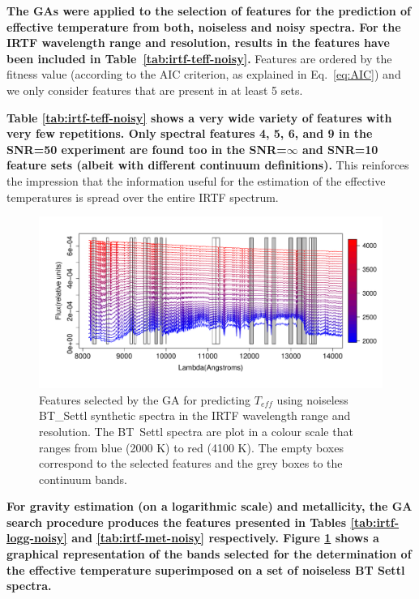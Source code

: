 \textbf{
The GAs were applied to the selection of features for the prediction
of effective temperature from both, noiseless and noisy spectra.  For
the IRTF wavelength range and resolution, results in the features have
been included in Table~\ref{tab:irtf-teff-noisy}.} Features are
ordered by the fitness value (according to the AIC criterion, as
explained in Eq.~\ref{eq:AIC}) and we only consider features that are
present in at least 5 sets.

{\bf Table
\ref{tab:irtf-teff-noisy}
shows a very wide variety of features with very few repetitions. Only
spectral features 4, 5, 6, and 9 in the SNR=50 experiment are found
too in the SNR=$\infty$ and SNR=10 feature sets (albeit with different
continuum definitions).} This reinforces the impression that the
information useful for the estimation of the effective temperatures is
spread over the entire IRTF spectrum.

\begin{figure}
\includegraphics[width=\textwidth]{figs/BT-spectraAtIRTF-Inf-teff2}
 \caption{Features selected by the GA for predicting $T_{eff}$ using
    noiseless BT\_Settl synthetic spectra in the IRTF wavelength range
    and resolution. The BT\ Settl spectra are plot in a colour scale
    that ranges from blue (2000 K) to red (4100 K). The empty boxes
    correspond to the selected features and the grey boxes to the
    continuum bands.}  \label{fig:IRTF-teff}
\end{figure}

{\bf For gravity estimation (on a logarithmic scale) and metallicity,
the GA search procedure produces the features presented in Tables
\ref{tab:irtf-logg-noisy} and \ref{tab:irtf-met-noisy}
respectively. Figure \ref{fig:IRTF-teff} shows a graphical
representation of the bands selected for the determination of the
effective temperature superimposed on a set of noiseless BT Settl
spectra.}

